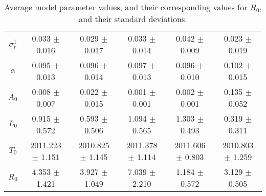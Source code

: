 \begin{sidewaystable}
\begin{tabular}{cccccc}
{\bf $\sigma^1_r$} & 0.033 $\pm$ 0.016 & 0.029 $\pm$ 0.017 & 0.033 $\pm$ 0.014 & 0.042 $\pm$ 0.009 & 0.023 $\pm$ 0.019 \\
{\bf $\alpha$} & 0.095 $\pm$ 0.013 & 0.096 $\pm$ 0.014 & 0.097 $\pm$ 0.013 & 0.096 $\pm$ 0.010 & 0.102 $\pm$ 0.015 \\
{\bf $A_0$} & 0.008 $\pm$ 0.007 & 0.022 $\pm$ 0.015 & 0.001 $\pm$ 0.001 & 0.002 $\pm$ 0.001 & 0.135 $\pm$ 0.052 \\
{\bf $L_0$} & 0.915 $\pm$ 0.572 & 0.593 $\pm$ 0.506 & 1.094 $\pm$ 0.565 & 1.303 $\pm$ 0.493 & 0.319 $\pm$ 0.311 \\
{\bf $T_0$} & 2011.223 $\pm$ 1.151 & 2010.825 $\pm$ 1.145 & 2011.378 $\pm$ 1.114 & 2011.606 $\pm$ 0.803 & 2010.803 $\pm$ 1.259 \\
{\bf $R_0$} & 4.353 $\pm$ 1.421& 3.927 $\pm$ 1.049& 7.039 $\pm$ 2.210& 1.184 $\pm$ 0.572& 3.129 $\pm$ 0.505\\
\hline\hline
\end{tabular}
\caption{Average model parameter values, and their corresponding values for $R_0$,  and their standard deviations.}
\label{Table:Parameter_Values}
\end{sidewaystable}
